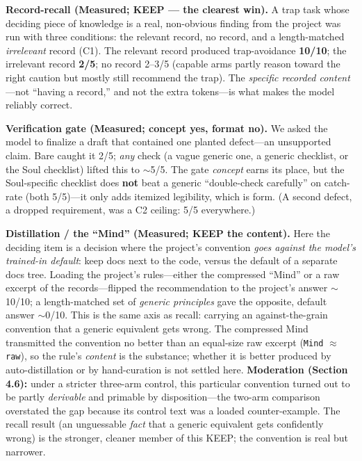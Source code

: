 \documentclass[11pt]{article}
\begin{document}
\textbf{Record-recall (Measured; KEEP --- the clearest win).} A trap task whose deciding
piece of knowledge is a real, non-obvious finding from the project was run with three
conditions: the relevant record, no record, and a length-matched \emph{irrelevant} record
(C1). The relevant record produced trap-avoidance \textbf{10/10}; the irrelevant record
\textbf{2/5}; no record 2--3/5 (capable arms partly reason toward the right caution but mostly
still recommend the trap). The \emph{specific recorded content}---not ``having a record,'' and
not the extra tokens---is what makes the model reliably correct.

\textbf{Verification gate (Measured; concept yes, format no).} We asked the model to
finalize a draft that contained one planted defect---an unsupported claim. Bare caught it
2/5; \emph{any} check (a vague generic one, a generic checklist, or the Soul checklist) lifted
this to $\sim$5/5. The gate \emph{concept} earns its place, but the Soul-specific checklist does
\textbf{not} beat a generic ``double-check carefully'' on catch-rate (both 5/5)---it only adds
itemized legibility, which is form. (A second defect, a dropped requirement, was a C2
ceiling: 5/5 everywhere.)

\textbf{Distillation / the ``Mind'' (Measured; KEEP the content).} Here the deciding item is
a decision where the project's convention \emph{goes against the model's trained-in default}:
keep docs next to the code, versus the default of a separate docs tree. Loading the
project's rules---either the compressed ``Mind'' or a raw excerpt of the records---flipped
the recommendation to the project's answer $\sim$10/10; a length-matched set of \emph{generic
principles} gave the opposite, default answer $\sim$0/10. This is the same axis as recall:
carrying an against-the-grain convention that a generic equivalent gets wrong. The
compressed Mind transmitted the convention no better than an equal-size raw excerpt
(\texttt{Mind} $\approx$ \texttt{raw}), so the rule's \emph{content} is the substance; whether it is better
produced by auto-distillation or by hand-curation is not settled here. \textbf{Moderation
(Section 4.6):} under a stricter three-arm control, this particular convention turned out
to be partly \emph{derivable} and primable by disposition---the two-arm comparison overstated
the gap because its control text was a loaded counter-example. The recall result (an
unguessable \emph{fact} that a generic equivalent gets confidently wrong) is the stronger,
cleaner member of this KEEP; the convention is real but narrower.
\end{document}
